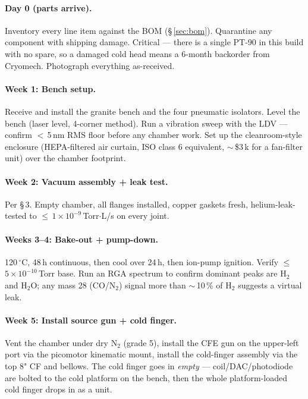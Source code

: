 \documentclass[11pt,letterpaper]{article}
\begin{document}
\paragraph{Day 0 (parts arrive).} Inventory every line item against the BOM (\S\,\ref{sec:bom}). Quarantine any component with shipping damage. Critical --- there is a single PT-90 in this build with no spare, so a damaged cold head means a 6-month backorder from Cryomech. Photograph everything as-received.

\paragraph{Week 1: Bench setup.} Receive and install the granite bench and the four pneumatic isolators. Level the bench (laser level, 4-corner method). Run a vibration sweep with the LDV --- confirm $<$\,5\,nm RMS floor before any chamber work. Set up the cleanroom-style enclosure (HEPA-filtered air curtain, ISO class 6 equivalent, $\sim$\,\$3\,k for a fan-filter unit) over the chamber footprint.

\paragraph{Week 2: Vacuum assembly + leak test.} Per \S\,3. Empty chamber, all flanges installed, copper gaskets fresh, helium-leak-tested to $\leq$\,$1 \times 10^{-9}$\,Torr$\cdot$L/s on every joint.

\paragraph{Weeks 3--4: Bake-out + pump-down.} 120\,$^\circ$C, 48\,h continuous, then cool over 24\,h, then ion-pump ignition. Verify $\leq$\,$5 \times 10^{-10}$\,Torr base. Run an RGA spectrum to confirm dominant peaks are H$_2$ and H$_2$O; any mass 28 (CO/N$_2$) signal more than $\sim$\,10\,\% of H$_2$ suggests a virtual leak.

\paragraph{Week 5: Install source gun + cold finger.} Vent the chamber under dry N$_2$ (grade 5), install the CFE gun on the upper-left port via the picomotor kinematic mount, install the cold-finger assembly via the top 8" CF and bellows. The cold finger goes in \textit{empty} --- coil/DAC/photodiode are bolted to the cold platform on the bench, then the whole platform-loaded cold finger drops in as a unit.
\end{document}
